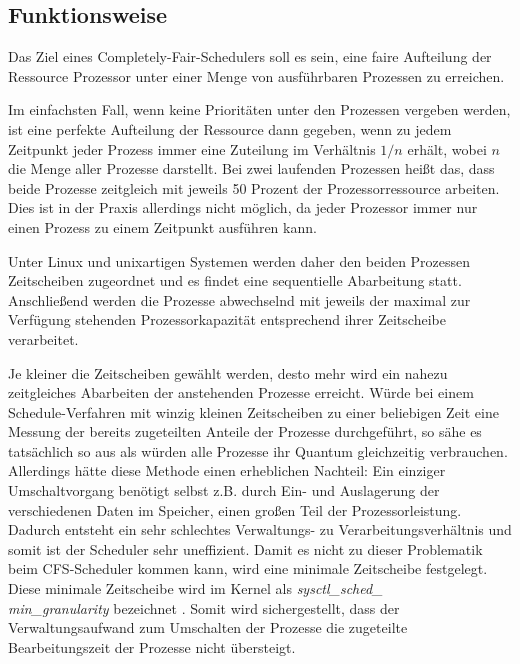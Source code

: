 \subsection{Funktionsweise}\label{s:cfs_fktweise}

Das Ziel eines  Completely-Fair-Schedulers{} soll es sein, eine faire Aufteilung der Ressource Prozessor unter einer Menge von ausführbaren Prozessen zu erreichen.


Im einfachsten Fall, wenn keine Prioritäten unter den Prozessen vergeben werden, ist eine perfekte Aufteilung der Ressource dann gegeben, wenn zu jedem Zeitpunkt jeder Prozess immer eine Zuteilung im Verhältnis $1/n$ erhält, wobei $n$ die Menge aller Prozesse darstellt.
Bei zwei laufenden Prozessen heißt das, dass beide Prozesse zeitgleich mit jeweils 50 Prozent der Prozessorressource arbeiten. Dies ist in der Praxis allerdings nicht möglich, da jeder Prozessor immer nur einen Prozess zu einem Zeitpunkt ausführen kann.

Unter Linux und unix\-artigen Systemen werden daher den beiden Prozessen Zeitscheiben zugeordnet und es findet eine sequentielle Abarbeitung statt. Anschließend werden die Prozesse abwechselnd mit jeweils der maximal zur Ver\-fügung stehenden Prozessorkapazität entsprechend ihrer Zeitscheibe verarbeitet.

Je kleiner die Zeitscheiben gewählt werden, desto mehr wird ein nahezu zeitgleiches Abarbeiten der anstehenden Prozesse erreicht.
Würde bei einem Schedule-Verfahren mit winzig kleinen Zeitscheiben zu einer beliebigen Zeit eine Messung der bereits zugeteilten Anteile der Prozesse durchgeführt, so sähe es tatsächlich so aus als wür\-den alle Prozesse ihr Quantum gleichzeitig verbrauchen.
Allerdings hätte diese Methode einen erheblichen Nachteil: Ein einziger Umschalt\-vorgang be\-nötigt selbst z.B. durch Ein- und Auslagerung der verschiedenen Daten im Speicher, einen großen Teil der Prozessorleistung. Dadurch entsteht ein sehr schlechtes Verwaltungs- zu Verarbeitungs\-verhält\-nis und somit ist der Scheduler sehr uneffizient. Damit es nicht zu dieser Problematik beim CFS-Scheduler kommen kann, wird eine minimale Zeitscheibe festgelegt. Diese minimale Zeitscheibe wird im Kernel als \textit{sysctl\_sched\_\\min\_granu\-larity} bezeichnet \cite{paperfairness}.
Somit wird sichergestellt, dass der Verwaltungsaufwand zum Umschalten der Prozesse die zugeteilte Bearbeitungszeit der Prozesse nicht übersteigt.


